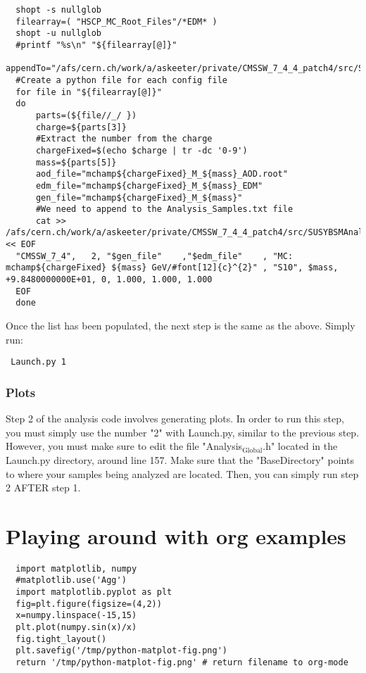 \documentclass[11 pt , letterpaper , twoside , openright]{book}
\begin{document}
\begin{enumerate}
\begin{lstlisting}
  shopt -s nullglob
  filearray=( "HSCP_MC_Root_Files"/*EDM* )
  shopt -u nullglob
  #printf "%s\n" "${filearray[@]}"
  appendTo="/afs/cern.ch/work/a/askeeter/private/CMSSW_7_4_4_patch4/src/SUSYBSMAnalysis/HSCP/test/AnalysisCode/Analysis_Samples.txt"
  #Create a python file for each config file    
  for file in "${filearray[@]}"
  do
      parts=(${file//_/ })
      charge=${parts[3]}
      #Extract the number from the charge
      chargeFixed=$(echo $charge | tr -dc '0-9')
      mass=${parts[5]}    
      aod_file="mchamp${chargeFixed}_M_${mass}_AOD.root"
      edm_file="mchamp${chargeFixed}_M_${mass}_EDM"
      gen_file="mchamp${chargeFixed}_M_${mass}"
      #We need to append to the Analysis_Samples.txt file
      cat >> /afs/cern.ch/work/a/askeeter/private/CMSSW_7_4_4_patch4/src/SUSYBSMAnalysis/HSCP/test/AnalysisCode/Analysis_Samples.txt << EOF
  "CMSSW_7_4",   2, "$gen_file"    ,"$edm_file"    , "MC: mchamp${chargeFixed} ${mass} GeV/#font[12]{c}^{2}" , "S10", $mass, +9.8480000000E+01, 0, 1.000, 1.000, 1.000
  EOF
  done
\end{lstlisting}

Once the list has been populated, the next step is the same as
the above. Simply run:

\lstset{language=sh,label=launch-Step-1,caption= ,numbers=none}
\begin{lstlisting}
 Launch.py 1
\end{lstlisting}
\end{enumerate}

\section{Plots}
\label{sec-1-1-5}

Step 2 of the analysis code involves generating plots. In order to
run this step, you must simply use the number "2" with Launch.py,
similar to the previous step. However, you must make sure to edit
the file "Analysis$_{\text{Global}}$.h" located in the Launch.py directory,
around line 157. Make sure that the "BaseDirectory" points to
where your samples being analyzed are located. Then, you can
simply run step 2 AFTER step 1.


\part{Playing around with org examples}
\label{sec-2}

\lstset{language=Python,label= ,caption= ,numbers=none}
\begin{lstlisting}
  import matplotlib, numpy
  #matplotlib.use('Agg')
  import matplotlib.pyplot as plt
  fig=plt.figure(figsize=(4,2))
  x=numpy.linspace(-15,15)
  plt.plot(numpy.sin(x)/x)
  fig.tight_layout()
  plt.savefig('/tmp/python-matplot-fig.png')
  return '/tmp/python-matplot-fig.png' # return filename to org-mode
\end{lstlisting}
\end{document}
